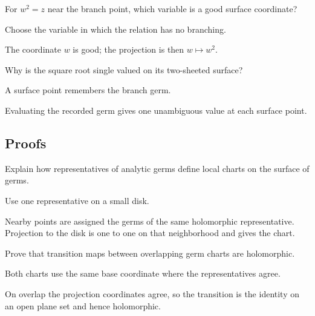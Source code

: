 \begin{exercise}\label{exr:iv22-expand-04}
For \(w^2=z\) near the branch point, which variable is a good surface coordinate?
\end{exercise}
\begin{hint}
Choose the variable in which the relation has no branching.
\end{hint}
\begin{solution}
The coordinate \(w\) is good; the projection is then \(w\mapsto w^2\).
\end{solution}

\begin{exercise}\label{exr:iv22-expand-05}
Why is the square root single valued on its two-sheeted surface?
\end{exercise}
\begin{hint}
A surface point remembers the branch germ.
\end{hint}
\begin{solution}
Evaluating the recorded germ gives one unambiguous value at each surface point.
\end{solution}

\subsection*{Proofs}

\begin{exercise}\label{exr:iv22-expand-06}
Explain how representatives of analytic germs define local charts on the surface of germs.
\end{exercise}
\begin{hint}
Use one representative on a small disk.
\end{hint}
\begin{solution}
Nearby points are assigned the germs of the same holomorphic representative. Projection to the disk is one to one on that neighborhood and gives the chart.
\end{solution}

\begin{exercise}\label{exr:iv22-expand-07}
Prove that transition maps between overlapping germ charts are holomorphic.
\end{exercise}
\begin{hint}
Both charts use the same base coordinate where the representatives agree.
\end{hint}
\begin{solution}
On overlap the projection coordinates agree, so the transition is the identity on an open plane set and hence holomorphic.
\end{solution}

